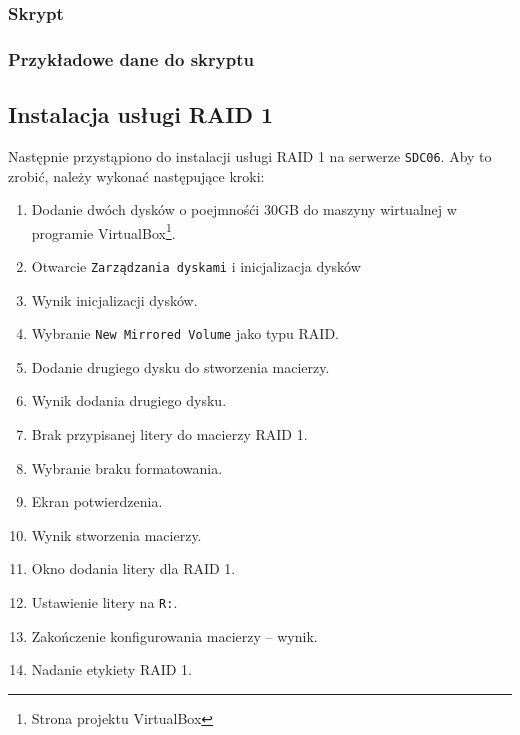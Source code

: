 \subsubsection{Skrypt}
\clearpage
\subsubsection{Przykładowe dane do skryptu}
\clearpage


\subsection{Instalacja usługi RAID 1}
Następnie przystąpiono do instalacji usługi RAID 1 na serwerze \texttt{SDC06}. Aby to zrobić, należy wykonać następujące kroki:
\begin{enumerate}
	\item Dodanie dwóch dysków o poejmnośći 30GB do maszyny wirtualnej w programie VirtualBox\footnote{Strona projektu VirtualBox\cite{VirtualBox}}.  %
	\item Otwarcie \texttt{Zarządzania dyskami} i inicjalizacja dysków  %
	\item Wynik inicjalizacji dysków.  %
	\item Wybranie \texttt{New Mirrored Volume} jako typu RAID.  %
	\item Dodanie drugiego dysku do stworzenia macierzy.  %
	\item Wynik dodania drugiego dysku.  %
	\item Brak przypisanej litery do macierzy RAID 1.  %
	\item Wybranie braku formatowania.  %
	\item Ekran potwierdzenia.  %
	\item Wynik stworzenia macierzy.  %
	\item Okno dodania litery dla RAID 1.  %
	\item Ustawienie litery na \texttt{R:}.  %
	\item Zakończenie konfigurowania macierzy – wynik.  %
	\item Nadanie etykiety RAID 1.  %
\end{enumerate}

